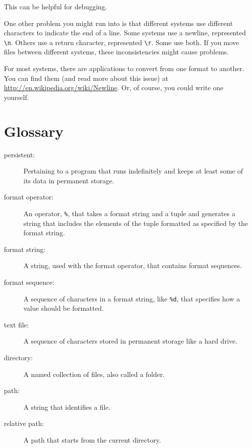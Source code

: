 \documentclass[10pt]{book}
\begin{document}
\begin{CJK}{UTF8}{gbsn}
This can be helpful for debugging.

One other problem you might run into is that different systems
use different characters to indicate the end of a line.  Some
systems use a newline, represented \verb"\n".  Others use
a return character, represented \verb"\r".  Some use both.
If you move files between different systems, these inconsistencies
might cause problems.

For most systems, there are applications to convert from one
format to another.  You can find them (and read more about this
issue) at \url{http://en.wikipedia.org/wiki/Newline}.  Or, of course, you
could write one yourself.


\section{Glossary}

\begin{description}

\item[persistent:] Pertaining to a program that runs indefinitely
and keeps at least some of its data in permanent storage.

\item[format operator:] An operator, {\tt \%}, that takes a format
string and a tuple and generates a string that includes
the elements of the tuple formatted as specified by the format string.

\item[format string:] A string, used with the format operator, that
contains format sequences.  

\item[format sequence:] A sequence of characters in a format string,
like {\tt \%d}, that specifies how a value should be formatted.

\item[text file:] A sequence of characters stored in permanent
storage like a hard drive.

\item[directory:] A named collection of files, also called a folder.

\item[path:] A string that identifies a file.

\item[relative path:] A path that starts from the current directory.


\end{description}
\end{CJK}
\end{document}

